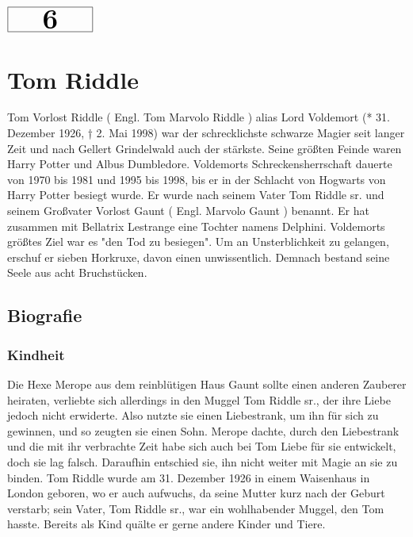 \documentclass[a4paper, 10pt]{article}
\begin{document}
\begin{minipage}[t]{\textwidth}
    \vspace*{-1.5cm} %
    \begin{flushright}
        \hspace*{\fill} %
        $\boxed{\textbf{\Huge\phantom{00}6\phantom{00}}}$ %
    \end{flushright}
\end{minipage}

\section*{\huge Tom Riddle}
Tom Vorlost Riddle (  Engl.  Tom Marvolo Riddle ) alias Lord Voldemort (* 31. Dezember 1926, † 2. Mai 1998) war der schrecklichste schwarze Magier seit langer Zeit und nach Gellert Grindelwald auch der stärkste. Seine größten Feinde waren Harry Potter und Albus Dumbledore. Voldemorts Schreckensherrschaft dauerte von 1970 bis 1981 und 1995 bis 1998, bis er in der Schlacht von Hogwarts von Harry Potter besiegt wurde. Er wurde nach seinem Vater Tom Riddle sr. und seinem Großvater Vorlost Gaunt (  Engl.  Marvolo Gaunt ) benannt. Er hat zusammen mit Bellatrix Lestrange eine Tochter namens Delphini.
\vspace{10pt}
\newline
{}  
Voldemorts größtes Ziel war es "den Tod zu besiegen". Um an Unsterblichkeit zu gelangen, erschuf er sieben Horkruxe, davon einen unwissentlich. Demnach bestand seine Seele aus acht Bruchstücken.

\subsection*{\Large Biografie}
\subsubsection*{\large Kindheit}
Die Hexe Merope aus dem reinblütigen Haus Gaunt sollte einen anderen Zauberer heiraten, verliebte sich allerdings in den Muggel Tom Riddle sr., der ihre Liebe jedoch nicht erwiderte. Also nutzte sie einen Liebestrank, um ihn für sich zu gewinnen, und so zeugten sie einen Sohn. Merope dachte, durch den Liebestrank und die mit ihr verbrachte Zeit habe sich auch bei Tom Liebe für sie entwickelt, doch sie lag falsch. Daraufhin entschied sie, ihn nicht weiter mit Magie an sie zu binden. Tom Riddle wurde am 31. Dezember 1926 in einem Waisenhaus in London geboren, wo er auch aufwuchs, da seine Mutter kurz nach der Geburt verstarb; sein Vater, Tom Riddle sr., war ein wohlhabender Muggel, den Tom hasste.
\vspace{10pt}
\newline
{}  
Bereits als Kind quälte er gerne andere Kinder und Tiere.
\end{document}
